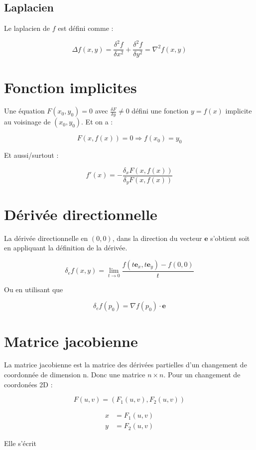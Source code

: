 \documentclass[12pt,a4paper]{report}
\begin{document}
\subsection{Laplacien}

Le laplacien de $f$ est défini comme :

$$\Delta f(x,y) = \frac{\delta^2f}{\delta x^2} + \frac{\delta^2f}{\delta y^2} = \nabla^2 f(x,y)$$

\section{Fonction implicites}

Une équation $F(x_0,y_0) = 0$ avec $\frac{\delta F}{\delta y} \neq 0$ défini une fonction $y=f(x)$ implicite au voisinage de $(x_0,y_0)$. Et on a :

$$F(x, f(x)) = 0 \Rightarrow f(x_0) = y_0$$

Et aussi/surtout :

$$f'(x) = - \frac{\delta_xF (x,f(x))}{\delta_yF(x,f(x))}$$

\section{Dérivée directionnelle}

La dérivée directionnelle en $(0,0)$, dans la direction du vecteur $\mathbf{e}$ s'obtient soit en appliquant la définition de la dérivée. 

$$\delta_e f(x,y) = \lim_{t \to 0} \frac{f(t\mathbf{e}_x, t\mathbf{e}_y) - f(0,0)}{t}$$

Ou en utilisant que

$$\delta_e f(p_0) = \nabla f(p_0) \cdot \mathbf{e}$$ 

\section{Matrice jacobienne}

La matrice jacobienne est la matrice des dérivées partielles d'un changement de coordonnée de dimension n. Donc une matrice $n\times n$. Pour un changement de coordonées 2D :

$$F(u,v) = (F_1(u,v),F_2(u,v))$$

\begin{align*}
x &= F_1(u,v) \\
y &= F_2(u,v) 
\end{align*}

Elle s'écrit
\end{document}

